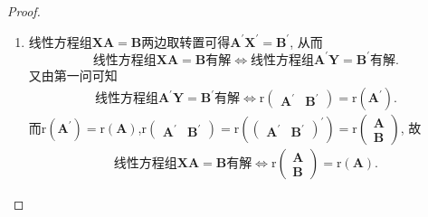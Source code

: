 \documentclass[../../main.tex]{subfiles}%
\begin{document}
\begin{proof}
\begin{enumerate}
\item 线性方程组\(\boldsymbol{XA}=\boldsymbol{B}\)两边取转置可得\(\boldsymbol{A}^{\prime}\boldsymbol{X}^{\prime}=\boldsymbol{B}^{\prime}\), 从而
\[
\text{线性方程组}\boldsymbol{XA}=\boldsymbol{B}\text{有解}\Leftrightarrow\text{线性方程组}\boldsymbol{A}^{\prime}\boldsymbol{Y}=\boldsymbol{B}^{\prime}\text{有解}.
\]
又由第一问可知
\begin{align*}
\text{线性方程组}\boldsymbol{A}^{\prime}\boldsymbol{Y}=\boldsymbol{B}^{\prime}\text{有解}\Leftrightarrow \mathrm{r}\begin{pmatrix}\boldsymbol{A}^{\prime}&\boldsymbol{B}^{\prime}\end{pmatrix}=\mathrm{r}(\boldsymbol{A}^{\prime}).
\end{align*}
而\(\mathrm{r}(\boldsymbol{A}^{\prime})=\mathrm{r}(\boldsymbol{A})\),\(\mathrm{r}\begin{pmatrix}\boldsymbol{A}^{\prime}&\boldsymbol{B}^{\prime}\end{pmatrix}=\mathrm{r}\left(\begin{pmatrix}\boldsymbol{A}^{\prime}&\boldsymbol{B}^{\prime}\end{pmatrix}^{\prime}\right)=\mathrm{r}\begin{pmatrix}\boldsymbol{A}\\\boldsymbol{B}\end{pmatrix}\), 故
\begin{align*}
\text{线性方程组}\boldsymbol{XA}=\boldsymbol{B}\text{有解}\Leftrightarrow \mathrm{r}\begin{pmatrix}\boldsymbol{A}\\\boldsymbol{B}\end{pmatrix}=\mathrm{r}(\boldsymbol{A}).
\end{align*} 
\end{enumerate}

\end{proof}
\end{document}
